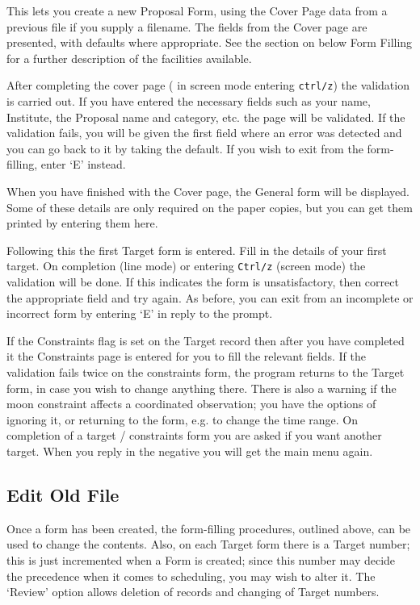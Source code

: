 This lets you create a new Proposal Form, using the Cover Page data
from a previous file if you supply a filename.  The fields from the
Cover page are presented, with defaults where appropriate.  See the
section on below Form Filling for a further description of the
facilities available.

After completing the cover page ( in screen mode entering
\verb+ctrl/z+) the validation is carried out.  If you have entered the
necessary fields such as your name, Institute, the Proposal name and
category, etc.  the page will be validated.  If the validation fails,
you will be given the first field where an error was detected and you
can go back to it by taking the default.  If you wish to exit from the
form-filling, enter `E' instead.

When you have finished with the Cover page, the General form will be
displayed.  Some of these details are only required on the paper
copies, but you can get them printed by entering them here.

Following this the first Target form is entered. Fill in the details of
your first target.  On completion (line mode) or entering \verb+Ctrl/z+
(screen mode) the validation will be done.  If this indicates the form
is unsatisfactory, then correct the appropriate field and try again. As
before, you can exit from an incomplete or incorrect form by entering
`E' in reply to the prompt.

If the Constraints flag is set on the Target record then after you have
completed it the Constraints page is entered for you to fill the
relevant fields.  If the validation fails twice on the constraints
form, the program returns to the Target form, in case you wish to
change anything there. There is also a warning if the moon constraint
affects a coordinated observation; you have the options of ignoring it,
or returning to the form, e.g. to change the time range.  On completion
of a target / constraints form you are asked if you want another
target. When you reply in the negative you will get the main menu
again.

\subsection{Edit Old File}

Once a form has been created, the form-filling procedures, outlined
above, can be used to change the contents. Also, on each Target form
there is a Target number; this is just incremented when a Form is
created; since this number may decide the precedence when it comes to
scheduling, you may wish to alter it.  The `Review' option allows
deletion of records and changing of Target numbers.

